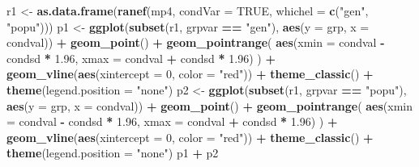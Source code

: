 \documentclass[
  12pt,
]{book}
\newenvironment{Shaded}{\begin{snugshade}}{\end{snugshade}}
\newcommand{\DataTypeTok}[1]{\textcolor[rgb]{0.13,0.29,0.53}{#1}}
\newcommand{\DecValTok}[1]{\textcolor[rgb]{0.00,0.00,0.81}{#1}}
\newcommand{\FloatTok}[1]{\textcolor[rgb]{0.00,0.00,0.81}{#1}}
\newcommand{\KeywordTok}[1]{\textcolor[rgb]{0.13,0.29,0.53}{\textbf{#1}}}
\newcommand{\NormalTok}[1]{#1}
\newcommand{\OperatorTok}[1]{\textcolor[rgb]{0.81,0.36,0.00}{\textbf{#1}}}
\newcommand{\OtherTok}[1]{\textcolor[rgb]{0.56,0.35,0.01}{#1}}
\newcommand{\StringTok}[1]{\textcolor[rgb]{0.31,0.60,0.02}{#1}}
\begin{document}
\begin{Shaded}
\begin{Highlighting}[]
\NormalTok{r1 \textless{}{-}}\StringTok{ }\KeywordTok{as.data.frame}\NormalTok{(}\KeywordTok{ranef}\NormalTok{(mp4, }\DataTypeTok{condVar =} \OtherTok{TRUE}\NormalTok{, }\DataTypeTok{whichel =} \KeywordTok{c}\NormalTok{(}\StringTok{"gen"}\NormalTok{, }\StringTok{"popu"}\NormalTok{)))}
\NormalTok{p1 \textless{}{-}}\StringTok{ }\KeywordTok{ggplot}\NormalTok{(}\KeywordTok{subset}\NormalTok{(r1, grpvar }\OperatorTok{==}\StringTok{ "gen"}\NormalTok{), }\KeywordTok{aes}\NormalTok{(}\DataTypeTok{y =}\NormalTok{ grp, }\DataTypeTok{x =}\NormalTok{ condval)) }\OperatorTok{+}
\StringTok{  }\KeywordTok{geom\_point}\NormalTok{() }\OperatorTok{+}
\StringTok{  }\KeywordTok{geom\_pointrange}\NormalTok{(}
    \KeywordTok{aes}\NormalTok{(}\DataTypeTok{xmin =}\NormalTok{ condval }\OperatorTok{{-}}\StringTok{ }\NormalTok{condsd }\OperatorTok{*}\StringTok{ }\FloatTok{1.96}\NormalTok{, }\DataTypeTok{xmax =}\NormalTok{ condval }\OperatorTok{+}\StringTok{ }\NormalTok{condsd }\OperatorTok{*}\StringTok{ }\FloatTok{1.96}\NormalTok{)}
\NormalTok{  ) }\OperatorTok{+}
\StringTok{  }\KeywordTok{geom\_vline}\NormalTok{(}\KeywordTok{aes}\NormalTok{(}\DataTypeTok{xintercept =} \DecValTok{0}\NormalTok{, }\DataTypeTok{color =} \StringTok{"red"}\NormalTok{)) }\OperatorTok{+}
\StringTok{  }\KeywordTok{theme\_classic}\NormalTok{() }\OperatorTok{+}
\StringTok{  }\KeywordTok{theme}\NormalTok{(}\DataTypeTok{legend.position =} \StringTok{"none"}\NormalTok{)}
\NormalTok{p2 \textless{}{-}}\StringTok{ }\KeywordTok{ggplot}\NormalTok{(}\KeywordTok{subset}\NormalTok{(r1, grpvar }\OperatorTok{==}\StringTok{ "popu"}\NormalTok{), }\KeywordTok{aes}\NormalTok{(}\DataTypeTok{y =}\NormalTok{ grp, }\DataTypeTok{x =}\NormalTok{ condval)) }\OperatorTok{+}
\StringTok{  }\KeywordTok{geom\_point}\NormalTok{() }\OperatorTok{+}
\StringTok{  }\KeywordTok{geom\_pointrange}\NormalTok{(}
    \KeywordTok{aes}\NormalTok{(}\DataTypeTok{xmin =}\NormalTok{ condval }\OperatorTok{{-}}\StringTok{ }\NormalTok{condsd }\OperatorTok{*}\StringTok{ }\FloatTok{1.96}\NormalTok{, }\DataTypeTok{xmax =}\NormalTok{ condval }\OperatorTok{+}\StringTok{ }\NormalTok{condsd }\OperatorTok{*}\StringTok{ }\FloatTok{1.96}\NormalTok{)}
\NormalTok{  ) }\OperatorTok{+}
\StringTok{  }\KeywordTok{geom\_vline}\NormalTok{(}\KeywordTok{aes}\NormalTok{(}\DataTypeTok{xintercept =} \DecValTok{0}\NormalTok{, }\DataTypeTok{color =} \StringTok{"red"}\NormalTok{)) }\OperatorTok{+}
\StringTok{  }\KeywordTok{theme\_classic}\NormalTok{() }\OperatorTok{+}
\StringTok{  }\KeywordTok{theme}\NormalTok{(}\DataTypeTok{legend.position =} \StringTok{"none"}\NormalTok{)}
\NormalTok{p1 }\OperatorTok{+}\StringTok{ }\NormalTok{p2}
\end{Highlighting}
\end{Shaded}
\end{document}
